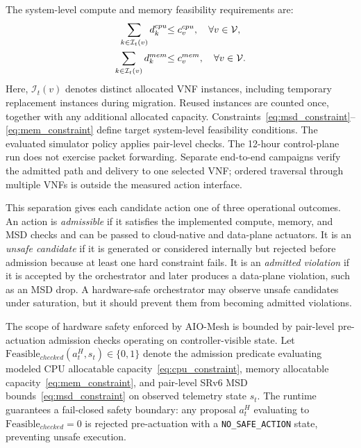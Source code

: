 \documentclass[final,5p]{elsarticle}
\newcommand{\rev}[1]{\textcolor{revisiongreen}{#1}}
\begin{document}
The system-level compute and memory feasibility requirements are:
\begin{align}
\rev{\sum_{k\in\mathcal{I}_t(v)}d_k^{cpu}}&\rev{\le c_v^{cpu},\quad\forall v\in\mathcal{V},}\label{eq:cpu_constraint}\\
\rev{\sum_{k\in\mathcal{I}_t(v)}d_k^{mem}}&\rev{\le c_v^{mem},\quad\forall v\in\mathcal{V}.}\label{eq:mem_constraint}
\end{align}
\rev{Here, \(\mathcal{I}_t(v)\) denotes distinct allocated VNF instances, including temporary replacement instances during migration. Reused instances are counted once, together with any additional allocated capacity.} Constraints~\eqref{eq:msd_constraint}--\eqref{eq:mem_constraint} define target system-level feasibility conditions. The evaluated simulator policy applies pair-level checks. The 12-hour control-plane run does not exercise packet forwarding. Separate end-to-end campaigns verify the admitted path and delivery to one selected VNF; ordered traversal through multiple VNFs is outside the measured action interface.

This separation gives each candidate action one of three operational outcomes. An action is \textit{admissible} if it satisfies \rev{the implemented} compute, memory, and MSD \rev{checks} and can be passed to cloud-native and data-plane actuators. It is an \textit{unsafe candidate} if it is generated or considered internally but rejected before admission because at least one hard constraint fails. It is an \textit{admitted violation} if it is accepted by the orchestrator and later produces a data-plane violation, such as an MSD drop. A hardware-safe orchestrator may observe unsafe candidates under saturation, but it should prevent them from becoming admitted violations.

\rev{The scope of hardware safety enforced by AIO-Mesh is bounded by pair-level pre-actuation admission checks operating on controller-visible state. Let $\mathrm{Feasible}_{checked}(a_t^H,s_t)\in\{0,1\}$ denote the admission predicate evaluating modeled CPU allocatable capacity~\eqref{eq:cpu_constraint}, memory allocatable capacity~\eqref{eq:mem_constraint}, and pair-level SRv6 MSD bounds~\eqref{eq:msd_constraint} on observed telemetry state $s_t$. The runtime guarantees a fail-closed safety boundary: any proposal $a_t^H$ evaluating to $\mathrm{Feasible}_{checked}=0$ is rejected pre-actuation with a \texttt{NO\_SAFE\_ACTION} state, preventing unsafe execution.}
\end{document}
